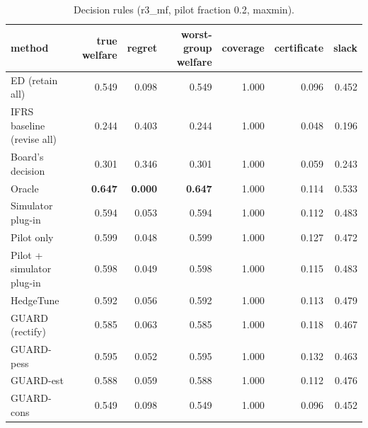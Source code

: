 \begin{table}[t]
\centering
\small
\begin{tabular}{lrrrrrr}
\toprule
method & true welfare & regret & worst-group welfare & coverage & certificate & slack \\
\midrule
ED (retain all) & 0.549 & 0.098 & 0.549 & 1.000 & 0.096 & 0.452 \\
IFRS baseline (revise all) & 0.244 & 0.403 & 0.244 & 1.000 & 0.048 & 0.196 \\
Board's decision & 0.301 & 0.346 & 0.301 & 1.000 & 0.059 & 0.243 \\
Oracle & \textbf{0.647} & \textbf{0.000} & \textbf{0.647} & 1.000 & 0.114 & 0.533 \\
Simulator plug-in & 0.594 & 0.053 & 0.594 & 1.000 & 0.112 & 0.483 \\
Pilot only & 0.599 & 0.048 & 0.599 & 1.000 & 0.127 & 0.472 \\
Pilot + simulator plug-in & 0.598 & 0.049 & 0.598 & 1.000 & 0.115 & 0.483 \\
HedgeTune & 0.592 & 0.056 & 0.592 & 1.000 & 0.113 & 0.479 \\
GUARD (rectify) & 0.585 & 0.063 & 0.585 & 1.000 & 0.118 & 0.467 \\
GUARD-pess & 0.595 & 0.052 & 0.595 & 1.000 & 0.132 & 0.463 \\
GUARD-est & 0.588 & 0.059 & 0.588 & 1.000 & 0.112 & 0.476 \\
GUARD-cons & 0.549 & 0.098 & 0.549 & 1.000 & 0.096 & 0.452 \\
\bottomrule
\end{tabular}
\caption{Decision rules (r3\_mf, pilot fraction 0.2, maxmin).}
\label{tab:methods-maxmin}
\end{table}
